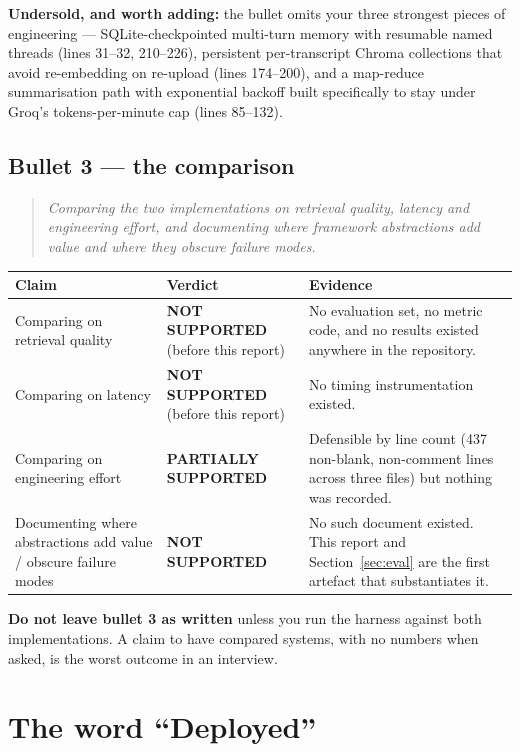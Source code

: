 \documentclass[11pt,a4paper]{article}
\newcommand{\PART}{\textcolor{partial}{\textbf{PARTIALLY SUPPORTED}}}
\newcommand{\NOT}{\textcolor{unsupported}{\textbf{NOT SUPPORTED}}}
\begin{document}
\noindent
\textbf{Undersold, and worth adding:} the bullet omits your three strongest pieces
of engineering --- SQLite-checkpointed multi-turn memory with resumable named
threads (lines 31--32, 210--226), persistent per-transcript Chroma collections
that avoid re-embedding on re-upload (lines 174--200), and a map-reduce
summarisation path with exponential backoff built specifically to stay under
Groq's tokens-per-minute cap (lines 85--132).

\subsection{Bullet 3 --- the comparison}

\begin{quote}\itshape
Comparing the two implementations on retrieval quality, latency and engineering
effort, and documenting where framework abstractions add value and where they
obscure failure modes.
\end{quote}

\begin{longtable}{@{}p{6.4cm}p{3.4cm}p{5.6cm}@{}}
\toprule
\textbf{Claim} & \textbf{Verdict} & \textbf{Evidence} \\
\midrule
\endhead
Comparing on retrieval quality & \NOT{} (before this report) & No evaluation set,
no metric code, and no results existed anywhere in the repository. \\
\addlinespace
Comparing on latency & \NOT{} (before this report) & No timing instrumentation
existed. \\
\addlinespace
Comparing on engineering effort & \PART & Defensible by line count
(437 non-blank, non-comment lines across three files) but nothing was recorded. \\
\addlinespace
Documenting where abstractions add value / obscure failure modes & \NOT & No such
document existed. This report and Section~\ref{sec:eval} are the first artefact
that substantiates it. \\
\bottomrule
\end{longtable}

\noindent
\textbf{Do not leave bullet 3 as written} unless you run the harness against both
implementations. A claim to have compared systems, with no numbers when asked,
is the worst outcome in an interview.

\section{The word ``Deployed''}\label{sec:deployed}
\end{document}
